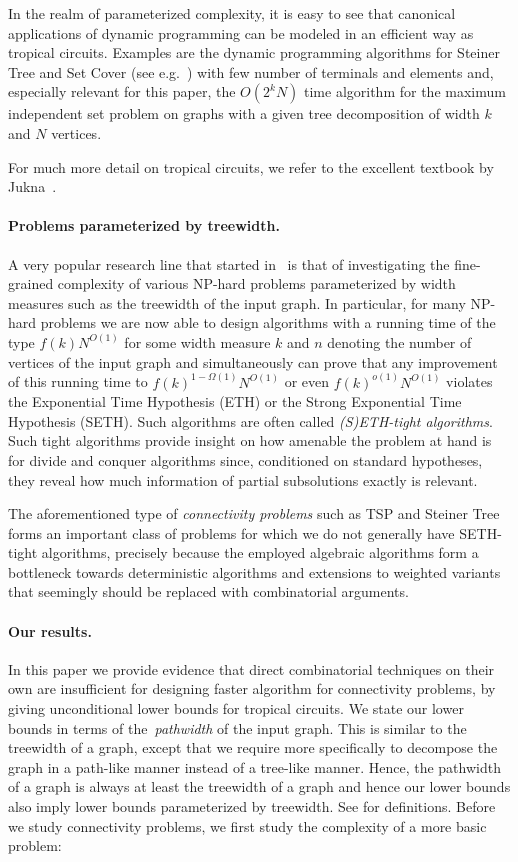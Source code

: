 \documentclass[11pt,a4paper]{article}
\begin{document}
In the realm of parameterized complexity, it is easy to see that canonical applications of dynamic programming can be modeled in an efficient way as tropical circuits. Examples are the dynamic programming algorithms for Steiner Tree and Set Cover (see e.g.~\cite[Section 6.1]{CyganFKLMPPS15}) with few number of terminals and elements and, especially relevant for this paper, the $O(2^{k} N)$ time algorithm for the maximum independent set problem on graphs with a given tree decomposition of width $k$ and $N$ vertices.

For much more detail on tropical circuits, we refer to the excellent textbook by Jukna~\cite{Jukna2023}.

\paragraph{Problems parameterized by treewidth.}
A very popular research line that started in~\cite{LokshtanovMS18b,LokshtanovMS18a} is that of investigating the fine-grained complexity of various NP-hard problems parameterized by width measures such as the treewidth of the input graph. 
In particular, for many NP-hard problems we are now able to design algorithms with a running time of the type $f(k)N^{O(1)}$ for some width measure $k$ and $n$ denoting the number of vertices of the input graph and simultaneously can prove that any improvement of this running time to $f(k)^{1-\Omega(1)}N^{O(1)}$ or even $f(k)^{o(1)}N^{O(1)}$ violates the Exponential Time Hypothesis (ETH) or the Strong Exponential Time Hypothesis (SETH). Such algorithms are often called \emph{(S)ETH-tight algorithms}. Such tight algorithms provide insight on how amenable the problem at hand is for divide and conquer algorithms since, conditioned on standard hypotheses, they reveal how much information of partial subsolutions exactly is relevant.

The aforementioned type of \emph{connectivity problems} such as TSP and Steiner Tree forms an important class of problems for which we do not generally have SETH-tight algorithms, precisely because the employed algebraic algorithms form a bottleneck towards deterministic algorithms and extensions to weighted variants that seemingly should be replaced with combinatorial arguments.


\paragraph{Our results.}
In this paper we provide evidence that direct combinatorial techniques on their own are insufficient for designing faster algorithm for connectivity problems, by giving unconditional lower bounds for tropical circuits. We state our lower bounds in terms of the~\emph{pathwidth} of the input graph. This is similar to the treewidth of a graph, except that we require more specifically to decompose the graph in a path-like manner instead of a tree-like manner. Hence, the pathwidth of a graph is always at least the treewidth of a graph and hence our lower bounds also imply lower bounds parameterized by treewidth. See  for definitions.
Before we study connectivity problems, we first study the complexity of a more basic problem:
\end{document}
